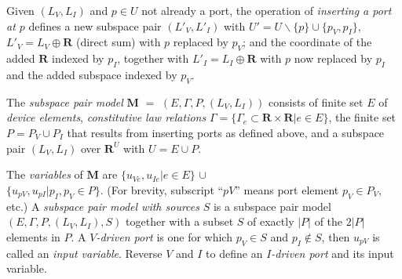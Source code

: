 \documentclass{article}
\def\Reals{\ensuremath{\mathbf R}}
\newcommand{\sminus}{\backslash}
\newcommand{\extra}[1]{}
\begin{document}
Given $(L_V, L_I)$ and $p\in U$ not already a port, 
the 
operation of \textit{inserting a port at  $p$} 
defines a new subspace pair $(L'_V, L'_I)$
with $U'=U\sminus \{p\}\cup\{p_V,p_I\}$, $L'_V=L_V\oplus\Reals$ (direct 
sum) with $p$ replaced by $p_V$;
and the coordinate of the added $\mathbf{R}$ 
indexed by $p_I$, together with
$L'_I=L_I\oplus\Reals$ with $p$ now replaced by $p_I$
and the added subspace indexed by $p_V$.
\extra{Note that (going to $(L'_V, L'_I)$) the ranks of
$L_V$ and $L_I$ each increase by 1, and $|U'|$ $=$ $|U|+1$.}
\extra{After $p$ port
insertions, we denote the final $U$ by $E\cup P_V \cup P_I$ 
with pairwise disjoint
$E$, $P_V$ and $P_I$, $|P_V|$ $=$ $|P_I|$ $=$ $p$, $P_V\cup P_I$ being the 
replacement elements.}

\extra{Questions of existence and 
uniqueness of solution for various combinations of 
kinds of sources are formulated after 
modeling devices.  
Each port element provides separate output and input
variables
for an 
electrical current or 
voltage \textit{kind of} source, or its mechanical analog.}
\extra{Unlike device variables, the two variables of each port
are not directly related by a constitutive law which is 
part of the system model.}

\extra{ Ports also facilitate formal operations to compose larger systems
from smaller ones.  We believe ports are important for investigations of
rigidity because they model how a framework interacts with its environment,
for example, what a mechanical model ``feels like'' when you squeeze it.
We have also found that electrical port characteristics of unit resistance
ported electrical networks are ratios of coefficients in certain 
partial evaluations 
of a generalization of the Tutte polynomial\cite{sdcPorted}.}


\pagebreak
The \textit{subspace pair model} $\mathbf{M}$ $=$ 
$(E, \Gamma, P, (L_V, L_I))$ consists of finite set $E$ of 
\textit{device elements}, \textit{constitutive law relations}
$\Gamma = \{\Gamma_e\subset\Reals\times\Reals | e \in E\}$, the finite set
$P=P_V \cup P_I$ that results from inserting ports as defined above, 
and a subspace pair $(L_V, L_I)$ over $\Reals^U$ with $U=E\cup P$.

The \textit{variables} of $\mathbf{M}$ are 
$\{u_{\mathit{Ve}}, u_{\mathit{Ie}} | e \in E\}$  $\cup$ \\
$\{ u_{\mathit{pV}}, u_{\mathit{pI}} | p_I, p_V \in P \}$.  
(For brevity, subscript ``$\mathit{pV}$'' means port element
$p_V\in P_V$, etc.)
A \textit{subspace pair model with sources} $S$ 
is a subspace pair model $(E, \Gamma, P, (L_V, L_I), S)$
together with a subset $S$ of exactly $|P|$ of the $2|P|$ elements
in $P$.  A \textit{$V$-driven port} is 
one for which 
$p_V\in S$ and $p_I\not\in S$, then $u_{\mathit{pV}}$ is called 
an \textit{input variable}.   Reverse $V$ and $I$ to define an 
\textit{$I$-driven port} and its input variable.
\end{document}
